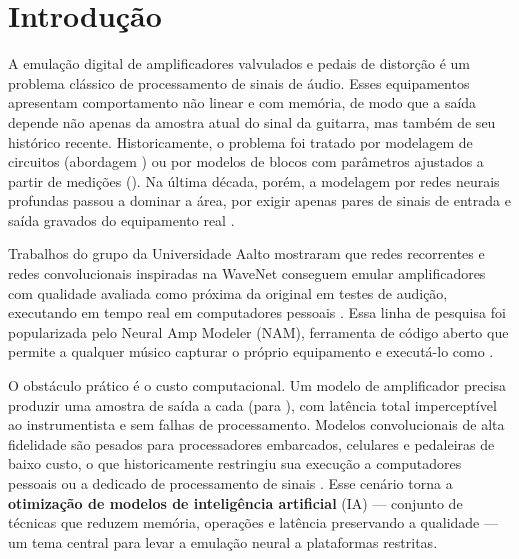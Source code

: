 \documentclass[%
  a4paper,%
  12pt,%
  fleqn,%
  english,%
  brazilian,%
]{article}
\begin{document}

\section{Introdução}%
\label{sect:intro}

A emulação digital de amplificadores valvulados e pedais de distorção é um problema clássico de processamento de sinais de áudio.
Esses equipamentos apresentam comportamento não linear e com memória, de modo que a saída depende não apenas da amostra atual do sinal da guitarra, mas também de seu histórico recente.
Historicamente, o problema foi tratado por modelagem de circuitos (abordagem ) ou por modelos de blocos com parâmetros ajustados a partir de medições ().
Na última década, porém, a modelagem  por redes neurais profundas passou a dominar a área, por exigir apenas pares de sinais de entrada e saída gravados do equipamento real \cite{Vanhatalo2022}.

Trabalhos do grupo da Universidade Aalto mostraram que redes recorrentes \cite{Wright2019} e redes convolucionais inspiradas na WaveNet \cite{Damskagg2019} conseguem emular amplificadores com qualidade avaliada como próxima da original em testes de audição, executando em tempo real em computadores pessoais \cite{Wright2020}.
Essa linha de pesquisa foi popularizada pelo Neural Amp Modeler (NAM), ferramenta de código aberto que permite a qualquer músico capturar o próprio equipamento e executá-lo como  \cite{Atkinson2023}.

O obstáculo prático é o custo computacional.
Um modelo de amplificador precisa produzir uma amostra de saída a cada  (para ), com latência total imperceptível ao instrumentista e sem falhas de processamento.
Modelos convolucionais de alta fidelidade são pesados para processadores embarcados, celulares e pedaleiras de baixo custo, o que historicamente restringiu sua execução a computadores pessoais ou a  dedicado de processamento de sinais \cite{Sato2026}.
Esse cenário torna a \textbf{otimização de modelos de inteligência artificial} (IA) --- conjunto de técnicas que reduzem memória, operações e latência preservando a qualidade \cite{Cheng2018} --- um tema central para levar a emulação neural a plataformas restritas.
\end{document}
